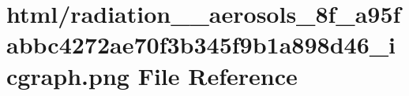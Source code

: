 \hypertarget{radiation____aerosols__8f__a95fabbc4272ae70f3b345f9b1a898d46__icgraph_8png}{}\section{html/radiation\+\_\+\+\_\+aerosols\+\_\+8f\+\_\+a95fabbc4272ae70f3b345f9b1a898d46\+\_\+icgraph.png File Reference}
\label{radiation____aerosols__8f__a95fabbc4272ae70f3b345f9b1a898d46__icgraph_8png}
